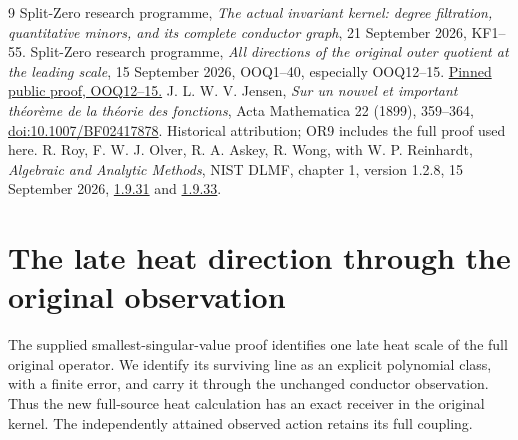 \documentclass[11pt]{article}
\begin{document}
\begin{thebibliography}{9}
 Split-Zero research programme, \emph{The actual invariant
kernel: degree filtration, quantitative minors, and its complete
conductor graph}, 21 September 2026, KF1--55.
 Split-Zero research programme,
\emph{All directions of the original outer quotient at the leading
scale}, 15 September 2026, OOQ1--40, especially OOQ12--15.
\href{https://github.com/KokunoYumeto/zeta-function-research-reader/blob/5992ad50c0f2a06921f1fcaded7b4e38097c0739/workbenches/splitzero-tandem/continuations/20260920-original-kernel-mixed-determinants/providers/09_INPUT_CUMULATIVE_PROOFS.tex#L23367}{Pinned public proof, OOQ12--15.}
 J. L. W. V. Jensen,
\emph{Sur un nouvel et important th\'eor\`eme de la th\'eorie des
fonctions}, Acta Mathematica 22 (1899), 359--364,
\href{https://doi.org/10.1007/BF02417878}{doi:10.1007/BF02417878}.
Historical attribution; OR9 includes the full proof used here.
 R. Roy, F. W. J. Olver, R. A. Askey, R. Wong,
with W. P. Reinhardt,
\emph{Algebraic and Analytic Methods}, NIST DLMF, chapter 1,
version 1.2.8, 15 September 2026,
\href{https://dlmf.nist.gov/1.9.E31}{1.9.31} and
\href{https://dlmf.nist.gov/1.9.E33}{1.9.33}.
\end{thebibliography}

\clearpage\part{The late heat direction through the original observation}
\label{part:3}

The supplied smallest-singular-value proof identifies one late heat
scale of the full original operator. We identify its surviving line
as an explicit polynomial class, with a finite error, and carry it
through the unchanged conductor observation. Thus the new full-source
heat calculation has an exact receiver in the original kernel.
The independently attained observed action retains its full coupling.
\end{document}
